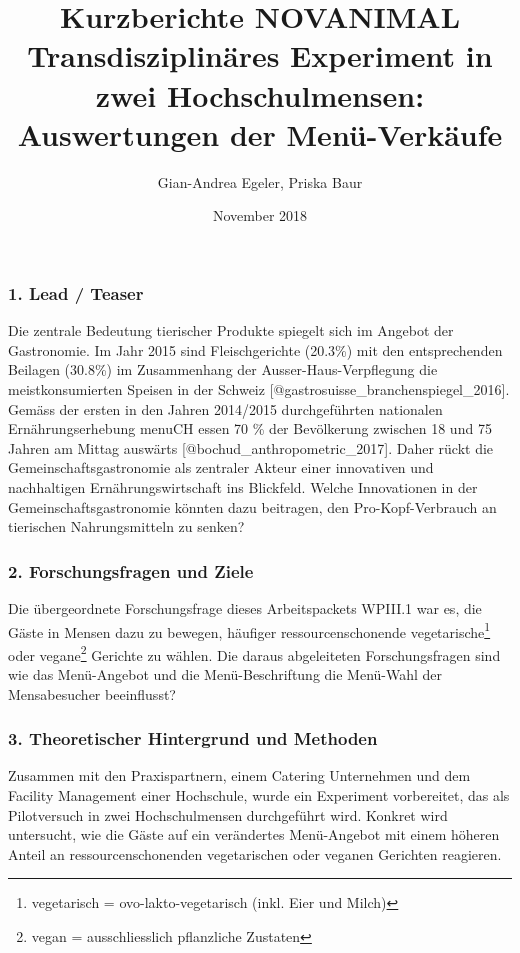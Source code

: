 \documentclass[12pt,ngerman,]{article}
\title{Kurzberichte NOVANIMAL\\
Transdisziplinäres Experiment in zwei Hochschulmensen: Auswertungen der
Menü-Verkäufe}
\author{Gian-Andrea Egeler, Priska Baur}
\date{November 2018}
\let\rmarkdownfootnote\footnote%
\def\footnote{\protect\rmarkdownfootnote}
\begin{document}
\maketitle

\hypertarget{lead-teaser}{%
\subsubsection{1. Lead / Teaser}\label{lead-teaser}}

Die zentrale Bedeutung tierischer Produkte spiegelt sich im Angebot der
Gastronomie. Im Jahr 2015 sind Fleischgerichte (20.3\%) mit den
entsprechenden Beilagen (30.8\%) im Zusammenhang der
Ausser-Haus-Verpflegung die meistkonsumierten Speisen in der Schweiz
{[}@gastrosuisse\_branchenspiegel\_2016{]}. Gemäss der ersten in den
Jahren 2014/2015 durchgeführten nationalen Ernährungserhebung menuCH
essen 70 \% der Bevölkerung zwischen 18 und 75 Jahren am Mittag auswärts
{[}@bochud\_anthropometric\_2017{]}. Daher rückt die
Gemeinschaftsgastronomie als zentraler Akteur einer innovativen und
nachhaltigen Ernährungswirtschaft ins Blickfeld. Welche Innovationen in
der Gemeinschaftsgastronomie könnten dazu beitragen, den
Pro-Kopf-Verbrauch an tierischen Nahrungsmitteln zu senken?

\hypertarget{forschungsfragen-und-ziele}{%
\subsubsection{2. Forschungsfragen und
Ziele}\label{forschungsfragen-und-ziele}}

Die übergeordnete Forschungsfrage dieses Arbeitspackets WPIII.1 war es,
die Gäste in Mensen dazu zu bewegen, häufiger ressourcenschonende
vegetarische\footnote{vegetarisch = ovo-lakto-vegetarisch (inkl. Eier
  und Milch)} oder vegane\footnote{vegan = ausschliesslich pflanzliche
  Zustaten} Gerichte zu wählen. Die daraus abgeleiteten Forschungsfragen
sind wie das Menü-Angebot und die Menü-Beschriftung die Menü-Wahl der
Mensabesucher beeinflusst?

\newpage

\hypertarget{theoretischer-hintergrund-und-methoden}{%
\subsubsection{3. Theoretischer Hintergrund und
Methoden}\label{theoretischer-hintergrund-und-methoden}}

Zusammen mit den Praxispartnern, einem Catering Unternehmen und dem
Facility Management einer Hochschule, wurde ein Experiment vorbereitet,
das als Pilotversuch in zwei Hochschulmensen durchgeführt wird. Konkret
wird untersucht, wie die Gäste auf ein verändertes Menü-Angebot mit
einem höheren Anteil an ressourcenschonenden vegetarischen oder veganen
Gerichten reagieren.
\end{document}
